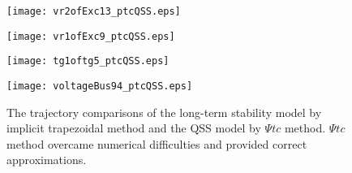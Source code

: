 \documentclass[journal]{IEEEtran}
\begin{document}
\begin{figure}[!ht]
\centering
\begin{minipage}[t]{0.5\linewidth}
\texttt{[image: vr2ofExc13\_ptcQSS.eps]}
\end{minipage}\begin{minipage}[t]{0.5\linewidth}
\texttt{[image: vr1ofExc9\_ptcQSS.eps]}
\end{minipage}
\begin{minipage}[t]{0.5\linewidth}
\texttt{[image: tg1oftg5\_ptcQSS.eps]}
\end{minipage}\begin{minipage}[t]{0.5\linewidth}
\texttt{[image: voltageBus94\_ptcQSS.eps]}
\end{minipage}
\caption{The trajectory comparisons of the long-term stability model by implicit trapezoidal method and the QSS model by $\Psi tc$ method. $\Psi tc$ method overcame numerical difficulties and provided correct approximations.}\label{TDSPTCQSS}
\end{figure}
\end{document}
